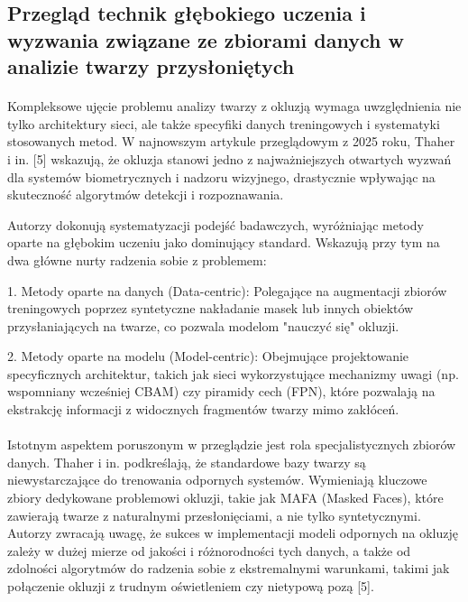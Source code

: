 \subsection{Przegląd technik głębokiego uczenia i wyzwania związane ze zbiorami danych w analizie twarzy przysłoniętych}

\paragraph{}Kompleksowe ujęcie problemu analizy twarzy z okluzją wymaga uwzględnienia nie tylko architektury sieci, ale także specyfiki danych treningowych i systematyki stosowanych metod. W najnowszym artykule przeglądowym z 2025 roku, Thaher i in. [5] wskazują, że okluzja stanowi jedno z najważniejszych otwartych wyzwań dla systemów biometrycznych i nadzoru wizyjnego, drastycznie wpływając na skuteczność algorytmów detekcji i rozpoznawania.

Autorzy dokonują systematyzacji podejść badawczych, wyróżniając metody oparte na głębokim uczeniu jako dominujący standard. Wskazują przy tym na dwa główne nurty radzenia sobie z problemem:

1. Metody oparte na danych (Data-centric): Polegające na augmentacji zbiorów treningowych poprzez syntetyczne nakładanie masek lub innych obiektów przysłaniających na twarze, co pozwala modelom "nauczyć się" okluzji.

2. Metody oparte na modelu (Model-centric): Obejmujące projektowanie specyficznych architektur, takich jak sieci wykorzystujące mechanizmy uwagi (np. wspomniany wcześniej CBAM) czy piramidy cech (FPN), które pozwalają na ekstrakcję informacji z widocznych fragmentów twarzy mimo zakłóceń.

\paragraph{}Istotnym aspektem poruszonym w przeglądzie jest rola specjalistycznych zbiorów danych. Thaher i in. podkreślają, że standardowe bazy twarzy są niewystarczające do trenowania odpornych systemów. Wymieniają kluczowe zbiory dedykowane problemowi okluzji, takie jak MAFA (Masked Faces), które zawierają twarze z naturalnymi przesłonięciami, a nie tylko syntetycznymi. Autorzy zwracają uwagę, że sukces w implementacji modeli odpornych na okluzję zależy w dużej mierze od jakości i różnorodności tych danych, a także od zdolności algorytmów do radzenia sobie z ekstremalnymi warunkami, takimi jak połączenie okluzji z trudnym oświetleniem czy nietypową pozą [5].

